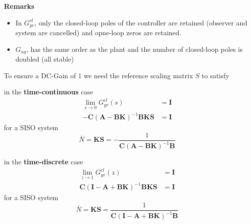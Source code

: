 \textbf{Remarks}
\begin{itemize}
    \item In $G_{yr}^{cl}$, only the closed-loop poles of the controller are retained (observer and system are cancelled) and opne-loop zeros are retained.
    \item $G_{uy}$, has the same order as the plant and the number of closed-loop poles is doubled (all stable)
\end{itemize}



To ensure a DC-Gain of $1$ we need the reference scaling matrix $S$ to satisfy

in the \textbf{time-continuous} case
\begin{align*}
    \lim_{s\to0}G_{yr}^{cl}(s)                             & = \mathbf{I} \\
    -\mathbf{C}{(\mathbf{A}-\mathbf{BK})}^{-1}\mathbf{BKS} & = \mathbf{I}
\end{align*}
for a SISO system
\begin{equation*}
    \bar{N}=\mathbf{KS}=-\frac{1}{\mathbf{C}{(\mathbf{A}-\mathbf{BK})}^{-1}\mathbf{B}}
\end{equation*}

in the \textbf{time-discrete} case
\begin{align*}
    \lim_{z\to1}G_{yr}^{cl}(z)                                       & = \mathbf{I} \\
    \mathbf{C}{(\mathbf{I}-\mathbf{A}+\mathbf{BK})}^{-1}\mathbf{BKS} & = \mathbf{I}
\end{align*}
for a SISO system
\begin{equation*}
    \bar{N}=\mathbf{KS}=\frac{1}{\mathbf{C}{(\mathbf{I}-\mathbf{A}+\mathbf{BK})}^{-1}\mathbf{B}}
\end{equation*}


